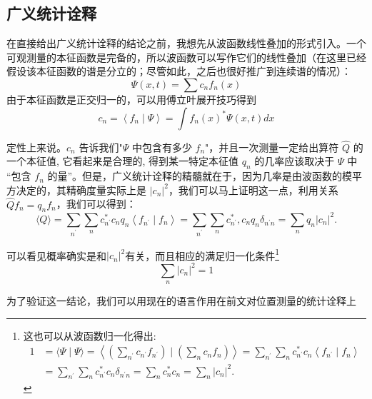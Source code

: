 		\subsection{广义统计诠释}	
			在直接给出广义统计诠释的结论之前，我想先从波函数线性叠加的形式引入。一个可观测量的本征函数是完备的，所以波函数可以写作它们的线性叠加（在这里已经假设该本征函数的谱是分立的；尽管如此，之后也很好推广到连续谱的情况）：
				\begin{equation}
					\Psi(x, t)=\sum c_{n} f_{n}(x)
				\end{equation}
			由于本征函数是正交归一的，可以用傅立叶展开技巧得到
				\begin{equation}
					c_{n}=\left\langle f_{n} \mid \Psi\right\rangle=\int f_{n}(x)^{*} \Psi(x, t) d x
				\end{equation}
			
			定性上来说。$c_{n}$ 告诉我们"$\Psi$ 中包含有多少 $f_{n}$"，并且一次测量一定给出算符 $\hat{Q}$ 的一个本征值, 它看起来是合理的, 得到某一特定本征值 $q_{n}$ 的几率应该取决于 $\Psi$ 中 “包含 $f_{n}$ 的量”。但是，广义统计诠释的精髓就在于，因为几率是由波函数的模平方决定的，其精确度量实际上是 $\left|c_{n}\right|^{2}$，我们可以马上证明这一点，利用关系$\hat{Q} f_{n}=q_{n} f_{n}$，我们可以得到：
			\begin{equation}
				\langle Q\rangle=\sum_{n^{\prime}} \sum_{n} c_{n^{\prime}}^{*} c_{n} q_{n}\left\langle f_{n^{\prime}} \mid f_{n}\right\rangle=\sum_{n^{\prime}} \sum_{n} c_{n^{\prime}}^{*}, c_{n} q_{n} \delta_{n^{\prime} n}=\sum_{n} q_{n}\left|c_{n}\right|^{2} .
			\end{equation}

			可以看见概率确实是和$|c_{n}|^2$有关，而且相应的满足归一化条件\footnote{这也可以从波函数归一化得出:
				$$
				\begin{aligned}
				1 &=\langle\Psi \mid \Psi\rangle=\left\langle\left(\sum_{n^{\prime}} c_{n^{\prime}} f_{n^{\prime}}\right) \mid\left(\sum_{n} c_{n} f_{n}\right)\right\rangle=\sum_{n^{\prime}} \sum_{n} c_{n^{\prime}}^{*} c_{n}\left\langle f_{n^{\prime}} \mid f_{n}\right\rangle \\
				&=\sum_{n^{\prime}} \sum_{n} c_{n^{\prime}}^{*} c_{n} \delta_{n^{\prime} n}=\sum_{n} c_{n}^{*} c_{n}=\sum_{n}\left|c_{n}\right|^{2} .
				\end{aligned}
				$$}
				\begin{equation}
					\sum_{n}\left|c_{n}\right|^{2}=1
				\end{equation}

			为了验证这一结论，我们可以用现在的语言作用在前文对位置测量的统计诠释上


















